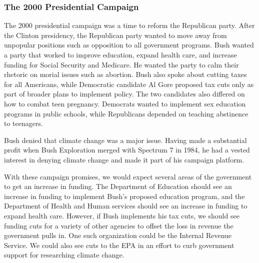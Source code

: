 \documentclass{article}
\begin{document}
        \subsubsection{The 2000 Presidential Campaign}
        The 2000 presidential campaign was a time to reform the Republican party. After the Clinton presidency, the Republican party wanted to move away from unpopular positions such as opposition to all government programs. Bush wanted a party that worked to improve education, expand health care, and increase funding for Social Security and Medicare. He wanted the party to calm their rhetoric on morial issues such as abortion. Bush also spoke about cutting taxes for all Americans, while Democratic candidate Al Gore proposed tax cuts only as part of broader plans to implement policy. The two candidates also differed on how to combat teen pregnancy. Democrats wanted to implement sex education programs in public schools, while Republicans depended on teaching abstinence to teenagers.\cite{bushcampaign2000}
        \par
        Bush denied that climate change was a major issue. Having made a substantial profit when Bush Exploration merged with Spectrum 7 in 1984, he had a vested interest in denying climate change and made it part of his campaign platform.\cite{bushhistory}
        \par
        With these campaign promises, we would expect several areas of the government to get an increase in funding. The Department of Education should see an increase in funding to implement Bush's proposed education program, and the Department of Health and Human services should see an increase in funding to expand health care. However, if Bush implements his tax cuts, we should see funding cuts for a variety of other agencies to offset the loss in revenue the government pulls in. One such organization could be the Internal Revenue Service. We could also see cuts to the EPA in an effort to curb government support for researching climate change.
\end{document}
